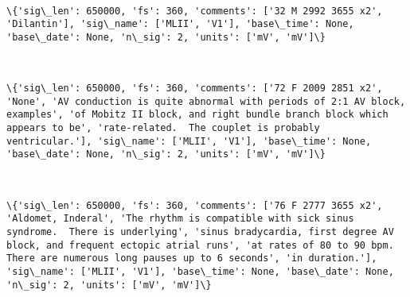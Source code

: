 \documentclass[11pt]{article}
\begin{document}
    \begin{center}
    \end{center}
    { \hspace*{\fill} \\}
    
    \begin{Verbatim}[commandchars=\\\{\}]
\{'sig\_len': 650000, 'fs': 360, 'comments': ['32 M 2992 3655 x2', 'Dilantin'], 'sig\_name': ['MLII', 'V1'], 'base\_time': None, 'base\_date': None, 'n\_sig': 2, 'units': ['mV', 'mV']\}

    \end{Verbatim}

    \begin{center}
    \end{center}
    { \hspace*{\fill} \\}
    
    \begin{Verbatim}[commandchars=\\\{\}]
\{'sig\_len': 650000, 'fs': 360, 'comments': ['72 F 2009 2851 x2', 'None', 'AV conduction is quite abnormal with periods of 2:1 AV block, examples', 'of Mobitz II block, and right bundle branch block which appears to be', 'rate-related.  The couplet is probably ventricular.'], 'sig\_name': ['MLII', 'V1'], 'base\_time': None, 'base\_date': None, 'n\_sig': 2, 'units': ['mV', 'mV']\}

    \end{Verbatim}

    \begin{center}
    \end{center}
    { \hspace*{\fill} \\}
    
    \begin{Verbatim}[commandchars=\\\{\}]
\{'sig\_len': 650000, 'fs': 360, 'comments': ['76 F 2777 3655 x2', 'Aldomet, Inderal', 'The rhythm is compatible with sick sinus syndrome.  There is underlying', 'sinus bradycardia, first degree AV block, and frequent ectopic atrial runs', 'at rates of 80 to 90 bpm.  There are numerous long pauses up to 6 seconds', 'in duration.'], 'sig\_name': ['MLII', 'V1'], 'base\_time': None, 'base\_date': None, 'n\_sig': 2, 'units': ['mV', 'mV']\}

    \end{Verbatim}
\end{document}
